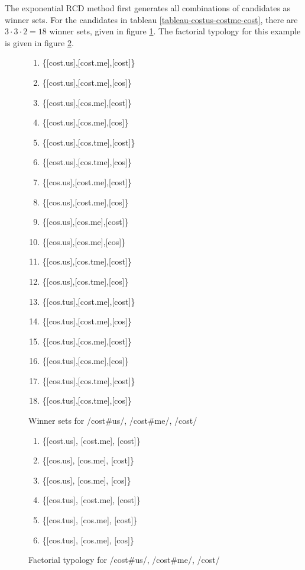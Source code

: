 \documentclass[11pt]{article}
\begin{document}
The exponential RCD method first generates all combinations of candidates as winner
sets. For the candidates in tableau \ref{tableau-costus-costme-cost},
there are $3\cdot3\cdot2=18$ winner sets, given in figure
\ref{candidates-costus-costme-cost}. The factorial typology for this
example is given in figure \ref{typology-costus-costme-cost}.

\begin{figure}
\begin{enumerate}
\item\{[cost.us],[cost.me],[cost]\}
\item\{[cost.us],[cost.me],[cos]\}
\item\{[cost.us],[cos.me],[cost]\}
\item\{[cost.us],[cos.me],[cos]\}
\item\{[cost.us],[cos.tme],[cost]\}
\item\{[cost.us],[cos.tme],[cos]\}
\item\{[cos.us],[cost.me],[cost]\}
\item\{[cos.us],[cost.me],[cos]\}
\item\{[cos.us],[cos.me],[cost]\}
\item\{[cos.us],[cos.me],[cos]\}
\item\{[cos.us],[cos.tme],[cost]\}
\item\{[cos.us],[cos.tme],[cos]\}
\item\{[cos.tus],[cost.me],[cost]\}
\item\{[cos.tus],[cost.me],[cos]\}
\item\{[cos.tus],[cos.me],[cost]\}
\item\{[cos.tus],[cos.me],[cos]\}
\item\{[cos.tus],[cos.tme],[cost]\}
\item\{[cos.tus],[cos.tme],[cos]\}
\end{enumerate}
  \caption{Winner sets for /cost\#us/, /cost\#me/, /cost/}
  \label{candidates-costus-costme-cost}
\end{figure}

\begin{figure}
  \begin{enumerate}
    \item \{[cost.us], [cost.me], [cost]\}
    \item \{[cos.us], [cos.me], [cost]\}
    \item \{[cos.us], [cos.me], [cos]\}
    \item \{[cos.tus], [cost.me], [cost]\}
    \item \{[cos.tus], [cos.me], [cost]\}
    \item \{[cos.tus], [cos.me], [cos]\}
  \end{enumerate}
  \caption{Factorial typology for /cost\#us/, /cost\#me/, /cost/}
  \label{typology-costus-costme-cost}
\end{figure}
\end{document}
